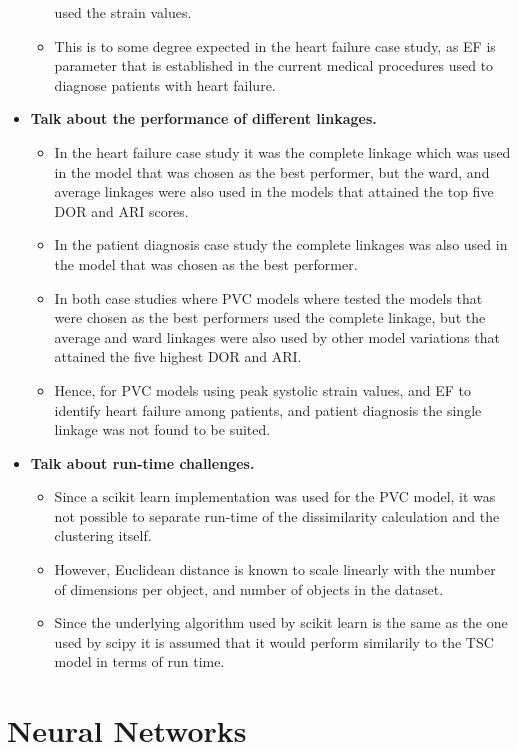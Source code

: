 \begin{itemize}
\begin{itemize}
              used the strain values. 
        \item This is to some degree expected in the heart failure case study, as EF is parameter that is established in the current medical procedures used to diagnose patients with heart failure.
    \end{itemize}
    \item \textbf{Talk about the performance of different linkages.}
    \begin{itemize}
        \item In the heart failure case study it was the complete linkage which was used in the model that was chosen as the best performer, but the ward, and average linkages were also used
              in the models that attained the top five DOR and ARI scores.
        \item In the patient diagnosis case study the complete linkages was also used in the model that was chosen as the best performer.
        \item In both case studies where PVC models where tested the models that were chosen as the best performers used the complete linkage, but the average and ward linkages were also used by
              other model variations that attained the five highest DOR and ARI.
        \item Hence, for PVC models using peak systolic strain values, and EF to identify heart failure among patients, and patient diagnosis the single linkage was not found to be suited.
    \end{itemize}
    \item \textbf{Talk about run-time challenges.}
    \begin{itemize}
        \item Since a scikit learn implementation was used for the PVC model, it was not possible to separate run-time of the dissimilarity calculation and the clustering itself.  
        \item However, Euclidean distance is known to scale linearly with the number of dimensions per object, and number of objects in the dataset.
        \item Since the underlying algorithm used by scikit learn is the same as the one used by scipy it is assumed that it would perform similarily to the TSC model in terms of run time.
    \end{itemize}
\end{itemize}

\section{Neural Networks}

